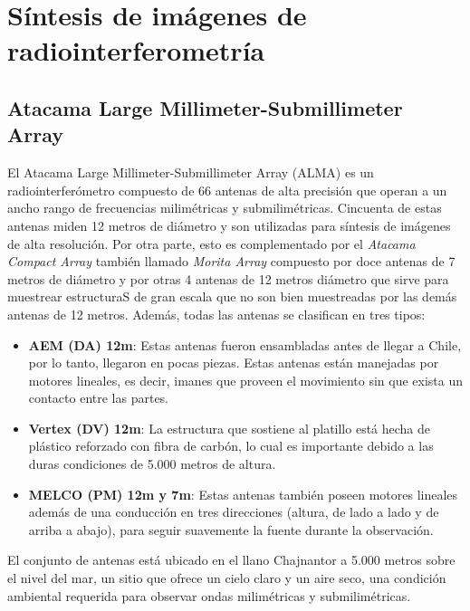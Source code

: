 \chapter{Síntesis de imágenes de radiointerferometría}
\label{cap:imagesynthesisinterferometry}

\section{Atacama Large Millimeter-Submillimeter Array}

El Atacama Large Millimeter-Submillimeter Array (ALMA) es un radiointerferómetro compuesto de 66 antenas de alta precisión que operan a un ancho rango de frecuencias milimétricas y submilimétricas. Cincuenta de estas antenas miden 12 metros de diámetro y son utilizadas para síntesis de imágenes de alta resolución. Por otra parte, esto es complementado por el \textit{Atacama Compact Array} también llamado \textit{Morita Array} compuesto por doce antenas de 7 metros de diámetro y por otras 4 antenas de 12 metros diámetro que sirve para muestrear estructuraS de gran escala que no son bien muestreadas por las demás antenas de 12 metros. Además, todas las antenas se clasifican en tres tipos:

\begin{itemize}
\item \textbf{AEM (DA) 12m}: Estas antenas fueron ensambladas antes de llegar a Chile, por lo tanto, llegaron en pocas piezas. Estas antenas están manejadas por motores lineales, es decir, imanes que proveen el movimiento sin que exista un contacto entre las partes.
\item \textbf{Vertex (DV) 12m}: La estructura que sostiene al platillo está hecha de plástico reforzado con fibra de carbón, lo cual es importante debido a las duras condiciones de 5.000 metros de altura.
\item \textbf{MELCO (PM) 12m y 7m}: Estas antenas también poseen motores lineales además de una conducción en tres direcciones (altura, de lado a lado y de arriba a abajo), para seguir suavemente la fuente durante la observación.
\end{itemize}

El conjunto de antenas está ubicado en el llano Chajnantor a 5.000 metros sobre el nivel del mar, un sitio que ofrece un cielo claro y un aire seco, una condición ambiental requerida para observar ondas milimétricas y submilimétricas.

